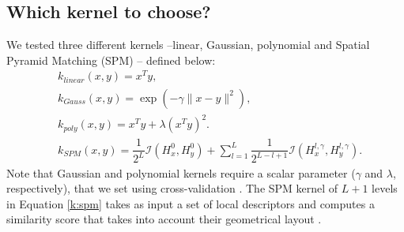 

\subsection{Which kernel to choose?}
We tested three different kernels --linear, Gaussian, polynomial and Spatial Pyramid Matching (SPM) -- defined below:
\begin{align}
    &k_{linear}(x,y) = x^Ty, \label{k:lin}\\
    &k_{Gauss}(x,y) = \exp(-\gamma\|x-y \|^2), \label{k:rbf}\\
    &k_{poly}(x,y) = x^Ty+\lambda(x^Ty)^2. \label{k:poly}\\
    &k_{SPM}(x,y) = \dfrac{1}{2^L}\mathcal{I}(H^0_x, H^0_y) +\sum_{l=1}^L\dfrac{1}{2^{L-l+1}}\mathcal{I}(H^{l,\gamma}_x, H^{l,\gamma}_y). \label{k:spm}
\end{align}
Note that Gaussian and polynomial kernels require a scalar parameter ($\gamma$ and $\lambda$, respectively), that we set using cross-validation .
The SPM kernel of $L+1$ levels in Equation \eqref{k:spm} takes as input a set of local descriptors and computes a similarity score that takes into account their geometrical layout \cite{spk}.


